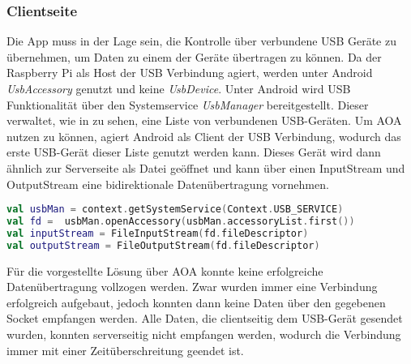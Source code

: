     \subsubsection{Clientseite}
        Die App muss in der Lage sein, die Kontrolle über verbundene USB Geräte zu übernehmen, um Daten zu einem der Geräte übertragen zu können. Da der Raspberry Pi als Host der USB Verbindung agiert, werden unter Android {\it UsbAccessory} genutzt und keine {\it UsbDevice}.
        Unter Android wird USB Funktionalität über den Systemservice {\it UsbManager} bereitgestellt. Dieser verwaltet, wie in  zu sehen, eine Liste von verbundenen USB-Geräten. Um AOA nutzen zu können, agiert Android als Client der USB Verbindung, wodurch das erste USB-Gerät dieser Liste genutzt werden kann. Dieses Gerät wird dann ähnlich zur Serverseite als Datei geöffnet und kann über einen InputStream und OutputStream eine bidirektionale Datenübertragung vornehmen.
        \begin{lstlisting}[frame=bt, label={lst:usb:client}, language=Kotlin, caption=Verbindungsaufbau über USB (Clientcode in Kotlin)]
val usbMan = context.getSystemService(Context.USB_SERVICE)
val fd =  usbMan.openAccessory(usbMan.accessoryList.first())
val inputStream = FileInputStream(fd.fileDescriptor)
val outputStream = FileOutputStream(fd.fileDescriptor)
        \end{lstlisting}
        Für die vorgestellte Lösung über AOA konnte keine erfolgreiche Datenübertragung vollzogen werden. Zwar wurden immer eine Verbindung erfolgreich aufgebaut, jedoch konnten dann keine Daten über den gegebenen Socket empfangen werden. Alle Daten, die clientseitig dem USB-Gerät gesendet wurden, konnten serverseitig nicht empfangen werden, wodurch die Verbindung immer mit einer Zeitüberschreitung geendet ist.
